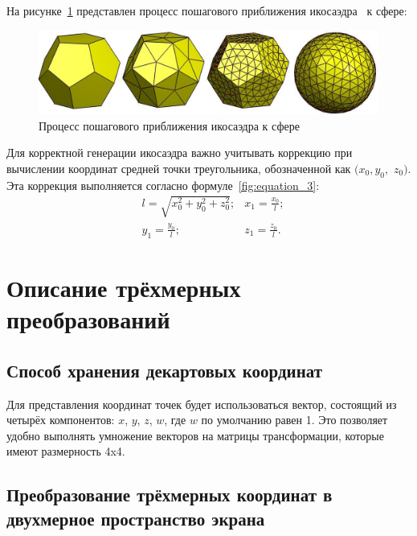 На рисунке~\ref{fig:picture_1} представлен процесс пошагового приближения икосаэдра~\cite{sphere} к сфере:
\begin{figure}[h]
	\begin{center}
		\includegraphics[width=\linewidth]{photos/sphere.png}
	\end{center}
	\caption{Процесс пошагового приближения икосаэдра к сфере}
	\label{fig:picture_1}
\end{figure}

Для корректной генерации икосаэдра важно учитывать коррекцию при вычислении координат средней точки треугольника, обозначенной как $(x_0, y_0,$ $z_0)$. 
Эта коррекция выполняется согласно формуле~\ref{fig:equation_3}:
\begin{equation}
	\begin{aligned}
		& l = \sqrt{x_0^2 + y_0^2 + z_0^2}; & x_1 = \frac{x_0}{l}; \\ 
		& y_1 = \frac{y_0}{l}; & z_1 = \frac{z_0}{l}.
	\end{aligned}
	\label{fig:equation_3}
\end{equation}

\section{Описание трёхмерных преобразований}
\subsection{Способ хранения декартовых координат}

Для представления координат точек будет использоваться вектор, состоящий из четырёх компонентов: $ x $, $y $, $z$, $w$, где $w$ по умолчанию равен 1. 
Это позволяет удобно выполнять умножение векторов на матрицы трансформации, которые имеют размерность 4x4.

\subsection{Преобразование трёхмерных координат в двухмерное пространство экрана}

